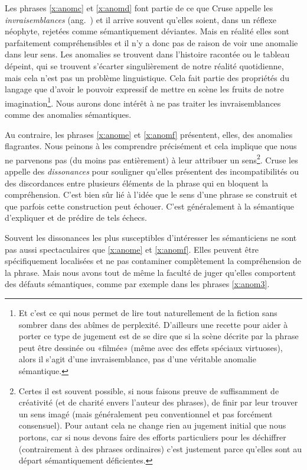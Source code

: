 \begin{refsegment}
Les phrases \ref{x:anomc} et \ref{x:anomd} font partie de ce que Cruse appelle les \emph{invraisemblances} (ang.\ ) et il arrive souvent qu'elles soient, dans un réflexe néophyte, rejetées comme sémantiquement déviantes.  Mais en réalité elles sont parfaitement compréhensibles et il n'y a donc pas de raison de voir une anomalie dans leur sens.  Les anomalies se trouvent dans l'histoire racontée ou le tableau dépeint, qui se trouvent s'écarter singulièrement de notre réalité quotidienne, mais cela n'est pas un problème linguistique.  Cela fait partie des propriétés du langage que d'avoir le pouvoir expressif de mettre en scène les fruits de notre imagination\footnote{Et c'est ce qui nous permet de lire tout naturellement de la fiction sans sombrer dans des abîmes de perplexité. D'ailleurs une recette pour aider à porter ce type de jugement  est de se dire que si la scène décrite par la phrase peut être dessinée ou «filmée» (même avec des effets spéciaux virtuoses), alors il s'agit d'une invraisemblance, pas d'une véritable  anomalie sémantique.}.  Nous aurons donc intérêt à ne pas traiter les invraisemblances comme des anomalies sémantiques.

Au contraire, les phrases \ref{x:anome} et \ref{x:anomf} présentent, elles, des anomalies flagrantes.  Nous peinons à les comprendre précisément et cela implique que nous ne parvenons pas (du moins pas entièrement) à leur attribuer un sens\footnote{Certes il est souvent possible, si nous faisons preuve de suffisamment de créativité (et de charité envers l'auteur des phrases), de finir par leur trouver un sens imagé (mais généralement peu conventionnel et pas forcément consensuel). Pour autant cela ne change rien au jugement initial que nous portons, car si nous devons faire des efforts particuliers pour les déchiffrer (contrairement à des phrases ordinaires) c'est justement parce qu'elles sont au départ sémantiquement déficientes.}.
Cruse les appelle des \emph{dissonances} pour souligner qu'elles présentent des incompatibilités ou des discordances entre plusieurs éléments de la phrase qui en bloquent la compréhension.  C'est bien sûr lié à l'idée que le sens d'une phrase se construit et que parfois cette construction peut échouer.  C'est généralement à la sémantique d'expliquer et de prédire de tels échecs. 

Souvent les dissonances les plus susceptibles d'intéresser les sémanticiens ne sont pas aussi spectaculaires que \ref{x:anome} et \ref{x:anomf}.  Elles peuvent être spécifiquement localisées et ne pas contaminer complètement la compréhension de la phrase. Mais nous avons tout de même la faculté de juger qu'elles comportent des défauts sémantiques, comme par exemple dans les phrases   \ref{x:anom3}. 
\largerpage


\end{refsegment}
